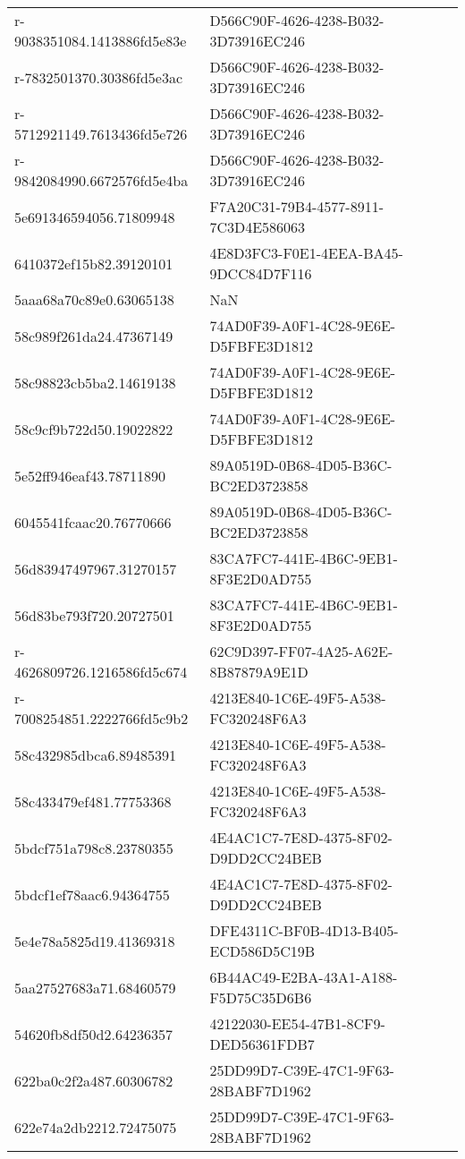 \begin{tabular}{ll}
r-9038351084.1413886fd5e83e & D566C90F-4626-4238-B032-3D73916EC246 \\
r-7832501370.30386fd5e3ac & D566C90F-4626-4238-B032-3D73916EC246 \\
r-5712921149.7613436fd5e726 & D566C90F-4626-4238-B032-3D73916EC246 \\
r-9842084990.6672576fd5e4ba & D566C90F-4626-4238-B032-3D73916EC246 \\
5e691346594056.71809948 & F7A20C31-79B4-4577-8911-7C3D4E586063 \\
6410372ef15b82.39120101 & 4E8D3FC3-F0E1-4EEA-BA45-9DCC84D7F116 \\
5aaa68a70c89e0.63065138 & NaN \\
58c989f261da24.47367149 & 74AD0F39-A0F1-4C28-9E6E-D5FBFE3D1812 \\
58c98823cb5ba2.14619138 & 74AD0F39-A0F1-4C28-9E6E-D5FBFE3D1812 \\
58c9cf9b722d50.19022822 & 74AD0F39-A0F1-4C28-9E6E-D5FBFE3D1812 \\
5e52ff946eaf43.78711890 & 89A0519D-0B68-4D05-B36C-BC2ED3723858 \\
6045541fcaac20.76770666 & 89A0519D-0B68-4D05-B36C-BC2ED3723858 \\
56d83947497967.31270157 & 83CA7FC7-441E-4B6C-9EB1-8F3E2D0AD755 \\
56d83be793f720.20727501 & 83CA7FC7-441E-4B6C-9EB1-8F3E2D0AD755 \\
r-4626809726.1216586fd5c674 & 62C9D397-FF07-4A25-A62E-8B87879A9E1D \\
r-7008254851.2222766fd5c9b2 & 4213E840-1C6E-49F5-A538-FC320248F6A3 \\
58c432985dbca6.89485391 & 4213E840-1C6E-49F5-A538-FC320248F6A3 \\
58c433479ef481.77753368 & 4213E840-1C6E-49F5-A538-FC320248F6A3 \\
5bdcf751a798c8.23780355 & 4E4AC1C7-7E8D-4375-8F02-D9DD2CC24BEB \\
5bdcf1ef78aac6.94364755 & 4E4AC1C7-7E8D-4375-8F02-D9DD2CC24BEB \\
5e4e78a5825d19.41369318 & DFE4311C-BF0B-4D13-B405-ECD586D5C19B \\
5aa27527683a71.68460579 & 6B44AC49-E2BA-43A1-A188-F5D75C35D6B6 \\
54620fb8df50d2.64236357 & 42122030-EE54-47B1-8CF9-DED56361FDB7 \\
622ba0c2f2a487.60306782 & 25DD99D7-C39E-47C1-9F63-28BABF7D1962 \\
622e74a2db2212.72475075 & 25DD99D7-C39E-47C1-9F63-28BABF7D1962 \\

\end{tabular}
